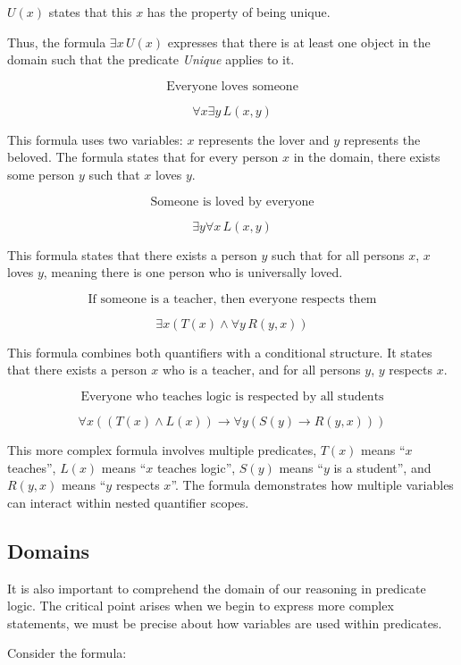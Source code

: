 \documentclass[12pt,a4paper,openany]{article}
\begin{document}
\(U(x)\) states that this \(x\) has the property of being unique.

Thus, the formula \(\exists x \, U(x)\) expresses that there is at least
one object in the domain such that the predicate \emph{Unique} applies
to it.

\[\text{Everyone loves someone}\]

\[\forall x \exists y \, L(x,y)\]

This formula uses two variables: \(x\) represents the lover and \(y\)
represents the beloved. The formula states that for every person \(x\)
in the domain, there exists some person \(y\) such that \(x\) loves
\(y\).

\[\text{Someone is loved by everyone}\]

\[\exists y \forall x \, L(x,y)\]

This formula states that there exists a person \(y\) such that for all
persons \(x\), \(x\) loves \(y\), meaning there is one person who is
universally loved.

\[\text{If someone is a teacher, then everyone respects them}\]

\[\exists x (T(x) \land \forall y \, R(y,x))\]

This formula combines both quantifiers with a conditional structure. It
states that there exists a person \(x\) who is a teacher, and for all
persons \(y\), \(y\) respects \(x\).

\[\text{Everyone who teaches logic is respected by all students}\]

\[\forall x ((T(x) \land L(x)) \to \forall y (S(y) \to R(y,x)))\]

This more complex formula involves multiple predicates, \(T(x)\) means
``\(x\) teaches'', \(L(x)\) means ``\(x\) teaches logic'', \(S(y)\)
means ``\(y\) is a student'', and \(R(y,x)\) means ``\(y\) respects
\(x\)''. The formula demonstrates how multiple variables can interact
within nested quantifier scopes.

\subsection{Domains}\label{domains}

It is also important to comprehend the domain of our reasoning in
predicate logic. The critical point arises when we begin to express more
complex statements, we must be precise about how variables are used
within predicates.

Consider the formula:
\end{document}
